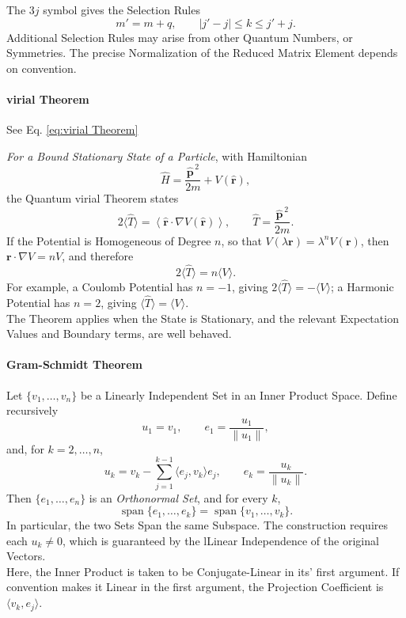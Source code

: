 \documentclass[a4paper, 10pt, onepage]{elegantbook}
\begin{document}
{The $3j$ symbol gives the Selection Rules
\[
m'=m+q,
\qquad
|j'-j|\le k\le j'+j.
\]
Additional Selection Rules may arise from other Quantum Numbers, or Symmetries. The precise Normalization of the Reduced Matrix Element depends on convention.

\newpage

\paragraph{virial Theorem} See Eq. \eqref{eq:virial Theorem}

\emph{For a Bound Stationary State of a Particle}, with Hamiltonian
\[
\hat{H}=\frac{\hat{\mathbf{p}}^{\,2}}{2m}+V(\hat{\mathbf{r}}),
\]
the Quantum virial Theorem states
\[
2\langle \hat{T}\rangle
=
\left\langle
\hat{\mathbf{r}}\cdot\nabla V(\hat{\mathbf{r}})
\right\rangle,
\qquad
\hat{T}=\frac{\hat{\mathbf{p}}^{\,2}}{2m}.
\]
If the Potential is Homogeneous of Degree $n$, so that $V(\lambda\mathbf{r})=\lambda^nV(\mathbf{r})$, then $\mathbf{r}\cdot\nabla V=nV$, and therefore
\[
2\langle \hat{T}\rangle=n\langle V\rangle.
\]
For example, a Coulomb Potential has $n=-1$, giving $2\langle \hat{T}\rangle=-\langle V\rangle$; a Harmonic Potential has $n=2$, giving $\langle \hat{T}\rangle=\langle V\rangle$.  \\

The Theorem applies when the State is Stationary, and the relevant Expectation Values and Boundary terms, are well behaved.

\newpage

\paragraph{Gram-Schmidt Theorem}   

\noindent

Let $\{v_1,\ldots,v_n\}$ be a Linearly Independent Set in an Inner
Product Space. Define recursively
\[
u_1=v_1,
\qquad
e_1=\frac{u_1}{\|u_1\|},
\]
and, for $k=2,\ldots,n$,
\[
u_k=v_k-\sum_{j=1}^{k-1}\langle e_j,v_k\rangle e_j,
\qquad
e_k=\frac{u_k}{\|u_k\|}.
\]
Then $\{e_1,\ldots,e_n\}$ is an \emph{Orthonormal Set}, and for every
$k$,
\[
\operatorname{span}\{e_1,\ldots,e_k\}
=
\operatorname{span}\{v_1,\ldots,v_k\}.
\]
In particular, the two Sets Span the same Subspace. The construction requires each $u_k\ne 0$, which is guaranteed by the lLinear Independence of the original Vectors.  \\

Here, the Inner Product is taken to be Conjugate-Linear in its' first argument. If convention makes it Linear in the first argument, the Projection Coefficient is $\langle v_k,e_j\rangle$.

}
\end{document}
